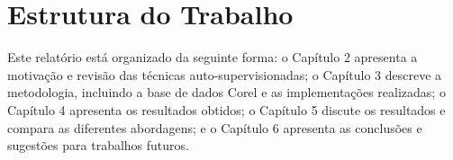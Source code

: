 \section{Estrutura do Trabalho}

Este relatório está organizado da seguinte forma: o Capítulo 2 apresenta a motivação e revisão das técnicas auto-supervisionadas; o Capítulo 3 descreve a metodologia, incluindo a base de dados Corel e as implementações realizadas; o Capítulo 4 apresenta os resultados obtidos; o Capítulo 5 discute os resultados e compara as diferentes abordagens; e o Capítulo 6 apresenta as conclusões e sugestões para trabalhos futuros.
